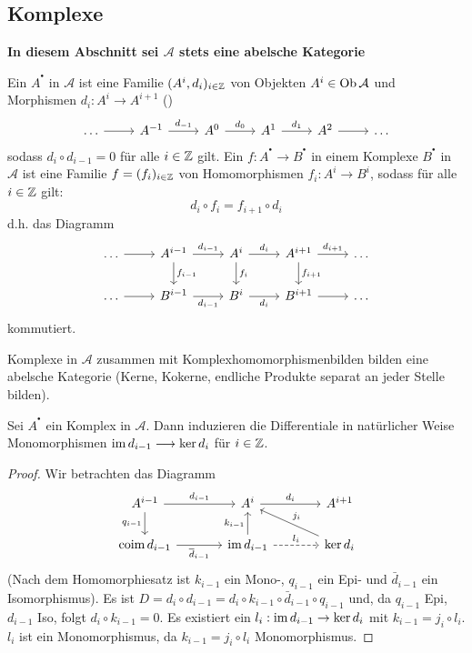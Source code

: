 \subsection{Komplexe}
\begin{center}
	\textbf{In diesem Abschnitt sei $\mathcal{A}$ stets eine abelsche Kategorie}
\end{center}
\begin{df}\label{7.1}
	Ein  $A^{^\bullet}$ in $\mathcal{A}$ ist eine Familie $(A^i, d_i)_{i\in \mathbb{Z}}$ von Objekten $A^i \in \text{Ob}\,\mathcal{A}$ und Morphismen $d_i: A^i \to A^{i+1}$ ()
	$$\begin{tikzcd}
	\ldots \arrow{r} & A^{-1} \arrow{r}{d_{-1}}& A^0 \arrow{r}{d_0} & A^1 \arrow{r}{d_1} & A^2 \arrow{r} & \ldots
	\end{tikzcd}$$
	sodass $d_i \circ d_{i-1} =0$ für alle $i\in \mathbb{Z}$ gilt. Ein   $f:A^{^\bullet} \to B^{^\bullet}$ in einem Komplexe $B^{^\bullet}$ in $\mathcal{A}$ ist eine Familie $f=(f_i)_{i\in \mathbb{Z}}$ von Homomorphismen $f_i : A^i \to B^i$, sodass für alle $i\in \mathbb{Z}$ gilt:
	$$d_i \circ f_i = f_{i+1} \circ d_i$$
	d.h. das Diagramm 
	$$\begin{tikzcd}
	\ldots \arrow{r} & A^{i-1}\arrow{d}{f_{i-1}} \arrow{r}{d_{i-1}}& A^i \arrow{d}{f_i}\arrow{r}{d_i} & A^{i+1} \arrow{d}{f_{i+1}} \arrow{r}{d_{i+1}} & \ldots\\
	\ldots \arrow{r} & B^{i-1} \arrow[swap]{r}{d_{i-1}} & B^i \arrow[swap]{r}{d_i} & B^{i+1} \arrow{r} & \ldots
	\end{tikzcd}$$
	kommutiert.
\end{df}
\begin{anm}
	Komplexe in $\mathcal{A}$ zusammen mit Komplexhomomorphismenbilden bilden eine abelsche Kategorie (Kerne, Kokerne, endliche Produkte separat an jeder Stelle bilden).
\end{anm}
\begin{bem}\label{7.2}
	Sei $A^{^\bullet}$ ein Komplex in $\mathcal{A}$. Dann induzieren die Differentiale in natürlicher Weise Monomorphismen $\operatorname{im} d_{i-1} \longrightarrow \ker d_i$ für $i\in \mathbb{Z}$.
\end{bem}
\begin{proof}
	Wir betrachten das Diagramm
	$$\begin{tikzcd}[column sep = large]
	A^{i-1} \arrow[swap]{d}{q_{i-1}} \arrow{r}{d_{i-1}} & A^i \arrow{r}{d_i} & A^{i+1} \\
	\text{coim} \, d_{i-1} \arrow[swap]{r}{\bar{d}_{i-1}} & \im d_{i-1} \arrow{u}{k_{i-1}}\arrow[dashed]{r}{l_i} & \ker d_i \arrow[swap]{ul}{j_i}
	\end{tikzcd}$$
	(Nach dem Homomorphiesatz ist $k_{i-1}$ ein Mono-, $q_{i-1}$ ein Epi- und $\bar{d}_{i-1}$ ein Isomorphismus). Es ist $D= d_i \circ d_{i-1} = d_i \circ k_{i-1} \circ \bar{d}_{i-1} \circ q_{i-1}$ und, da $q_{i-1}$ Epi, $d_{i-1}$ Iso, folgt $d_i \circ k_{i-1} =0$. Es existiert ein $l_i : \operatorname{im} d_{i-1} \to \ker d_i$ mit $k_{i-1} = j_i \circ l_i$. $l_i$ ist ein Monomorphismus, da $k_{i-1} = j_i \circ l_i$ Monomorphismus.
\end{proof}
